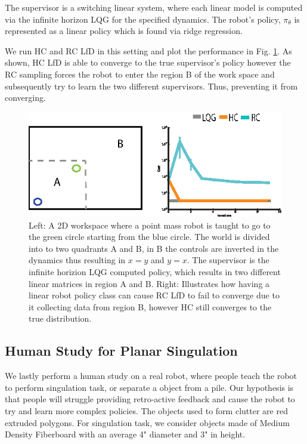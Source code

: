 \documentclass[10pt, conference]{ieeeconf}      %
\begin{document}
The supervisor is a switching linear system, where each linear model is computed via the infinite horizon LQG for the specified dynamics. The robot's policy, $\pi_{\theta}$ is represented as a linear policy which is found via ridge regression.

We run HC and RC LfD in this setting and plot the performance in Fig. \ref{fig:p_mass}. As shown, HC LfD is able to converge to the true supervisor's policy however the RC sampling  forces the robot to enter the region B of the work space and subsequently try to learn the two different supervisors. Thus, preventing it from converging. 

\begin{figure}
\centering
\includegraphics{f_figs/p_mass.eps}
\caption{
    \footnotesize
Left: A 2D workspace where a point mass robot is taught to go to the green circle starting from the blue circle. The world is divided into to two quadrants A and B, in B the controls are inverted in the dynamics thus resulting in $x=y$ and $y=x$. The supervisor is the infinite horizion LQG computed policy, which results in two different linear matrices in region A and B. Right: Illustrates how having a linear robot policy class can cause RC LfD to fail  to converge due to it collecting data from region B, however HC still converges to the true distribution. }
\vspace*{-1pt}
\label{fig:p_mass}
\end{figure}

\subsection{Human Study for Planar Singulation}
We lastly perform a human study on a real robot, where people teach the robot to perform singulation task, or separate a object from a pile. Our hypothesis is that people will struggle providing retro-active feedback and cause the robot to try and learn more complex policies.  The objects used to form clutter are red extruded polygons.  For singulation task, we consider objects made of Medium Density Fiberboard with an average 4" diameter and 3" in height. 
\end{document}
